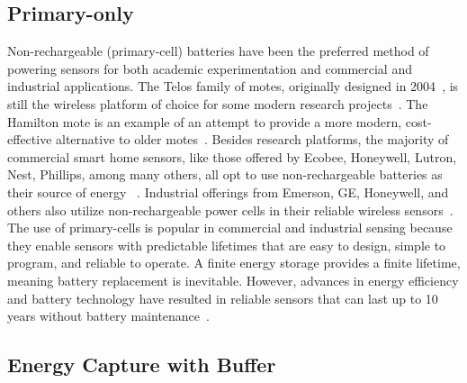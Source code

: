 \subsection{Primary-only}
Non-rechargeable (primary-cell) batteries have been the preferred
method of powering sensors for both academic experimentation
and commercial and industrial applications.
The Telos family of motes, originally designed in 2004~\cite{polastre2005telos},
is still the wireless platform of choice for some modern research projects~\cite{mohammad2018codecast,li2019privacy}.
The Hamilton mote is an example of an attempt to provide a more modern, cost-effective alternative to older motes~\cite{andersen2017hamilton}.
Besides research platforms, the majority of commercial smart home sensors, like those offered by Ecobee, Honeywell, Lutron, Nest, Phillips, among many others, all opt to use non-rechargeable batteries as their source of energy
~\cite{ecobeeSensor, honeywellThermostat, lutronSolutions, googleNestTemperature, hueSensor}.
Industrial offerings from Emerson, GE, Honeywell, and others also utilize non-rechargeable power cells in their reliable wireless sensors~\cite{emersonRosemount,GEInsightMesh,honeywellOneWireless}.
The use of primary-cells is popular in commercial and industrial sensing because they enable sensors with predictable lifetimes that are easy to
design, simple to program, and reliable to operate.
A finite energy storage provides a finite lifetime, meaning battery replacement is inevitable. However, advances in energy efficiency and battery technology have resulted in reliable sensors that can last up to 10 years without battery maintenance~\cite{emersonRosemount,honeywellOneWireless, lutronSolutions}.

\subsection{Energy Capture with Buffer}

